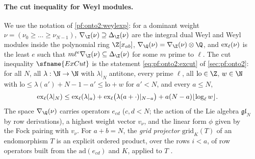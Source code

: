 \paragraph{The cut inequality for Weyl modules.} We use the notation of \cref{pf:onto2:weylexp}: for a dominant weight
$\nu=(\nu_0\ge\dots\ge\nu_{N-1})$, $\nabla_\Z(\nu)\supseteq\Delta_\Z(\nu)$ are the integral dual Weyl and Weyl modules inside the polynomial
ring $\Z[x_{ab}]$, $\nabla_\Q(\nu)=\nabla_\Z(\nu)\otimes\Q$, and $\operatorname{ex}_\ell(\nu)$ is the least $e$ such that $m\ell^e\nabla_\Z(\nu)\subseteq\Delta_\Z(\nu)$ for
some $m$ prime to $\ell$. The cut inequality $\sfname{ExCut}$ is the statement \eqref{eq:pf:onto2:excut} of \cref{sec:pf:onto2}: for all $N$,
all $\lambda:\N\to\N$ with $\lambda|_N$ antitone, every prime $\ell$, all $\mathrm{lo}\in\Z$, $w\in\N$ with $\mathrm{lo}\le\lambda(a')+N-1-a'\le
\mathrm{lo}+w$ for $a'<N$, and every $a\le N$,
\[
\operatorname{ex}_\ell(\lambda|_N)\le\operatorname{ex}_\ell(\lambda|_a)+\operatorname{ex}_\ell\bigl(\lambda(a+\cdot)|_{N-a}\bigr)+a(N-a)\lfloor\log_\ell w\rfloor .
\]
The space $\nabla_\Q(\nu)$ carries operators $e_{cd}$ ($c,d<N$; the action of the Lie algebra $\mathfrak{gl}_N$ by row derivations), a
highest weight vector $v_\nu$, and the linear form $\phi$ given by the Fock pairing with $v_\nu$. For $a+b=N$, the \emph{grid projector}
$\mathrm{grid}_K(T)$ of an endomorphism $T$ is an explicit ordered product, over the rows $i<a$, of row operators built from the
$\mathrm{ad}(e_{cd})$ and $K$, applied to $T$ \cite{LeanSource2026}.

